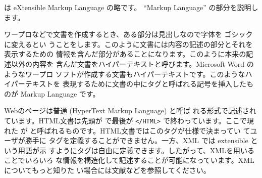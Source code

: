 は eXtensible Markup Language の略です。
``Markup Language'' の部分を説明します。

ワープロなどで文書を作成するとき、ある部分は見出しなので字体を
ゴシックに変えるとい
うことをします。このように文書には内容の記述の部分とそれを表示するための
情報を含んだ部分があることになります。このように本来の記述以外の内容を
含んだ文書をハイパーテキストと呼びます。Microsoft Word のようなワープロ
ソフトが作成する文書もハイパーテキストです。このようなハイパーテキストを
表現するために文書の中にタグと呼ばれる記号を挿入したものが Markup
Language です。

Webのページは普通 (HyperText Markup Language) と呼ば
れる形式で記述されています。HTML文書は先頭が で最後が
\texttt{</HTML>} で終わっています。ここで現れた  が
と呼ばれるものです。HTML文書ではこのタグが仕様で決まってい
てユーザが勝手に
タグを定義することができません。一方、XML では extensible という用語が示
すようにタグは自由に定義できます。したがって、XMLを用いることでいろいろ
な情報を構造化して記述することが可能になっています。XMLについてもっと知りた
い場合には文献\cite{IntroXML}などを参照してください。

